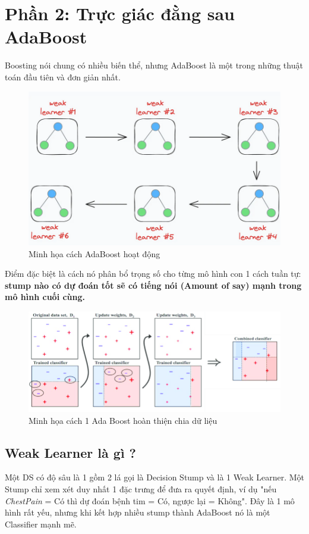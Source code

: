 \documentclass[11pt]{article}
\begin{document}
\section{Phần 2: Trực giác đằng sau AdaBoost }
Boosting nói chung có nhiều biến thể, nhưng AdaBoost là một trong những thuật toán đầu tiên và đơn giản nhất.
\begin{figure}[H]
    \centering
    \includegraphics[width=0.7\linewidth]{images/ada_pipeline.png}
    \caption{Minh họa cách AdaBoost hoạt động}
\end{figure}
 Điểm đặc biệt là cách nó phân bổ trọng số cho từng mô hình con 1 cách tuần tự: \textbf{stump nào có dự đoán tốt sẽ có tiếng nói (Amount of say) mạnh trong mô hình cuối cùng.} 
\begin{figure}[H]
    \centering
    \includegraphics[width=0.85\linewidth]{images/ada_vs.png}
    \caption{Minh họa cách 1 Ada Boost hoàn thiện chia dữ liệu}
\end{figure}


\subsection{Weak Learner là gì ?}
Một DS có độ sâu là 1 gồm 2 lá gọi là Decision Stump và là 1 Weak Learner. Một Stump chỉ xem xét duy nhất 1 đặc trưng để đưa ra quyết định, ví dụ "nếu  \textit{ChestPain} = Có thì dự đoán bệnh tim = Có, ngược lại = Không". Đây là 1 mô hình rất yếu, nhưng khi kết hợp nhiều stump thành AdaBoost nó là một Classifier mạnh mẽ. 
\end{document}
